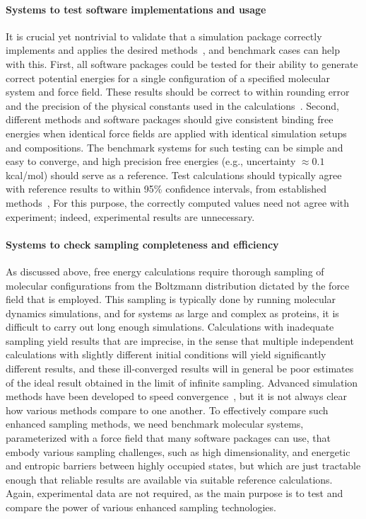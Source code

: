 \documentclass[aps,pre,twocolumn,nofootinbib,superscriptaddress,10pt, final,tightenlines]{revtex4-1}
\begin{document}
\paragraph{Systems to test software implementations and usage}
It is crucial yet nontrivial to validate that a simulation package correctly implements and applies the desired methods~\cite{shirts_lessons_2016}, and benchmark cases can help with this.  
First, all software packages could be tested for their ability to generate correct potential energies for a single configuration of a specified molecular system and force field. 
These results should be correct to within rounding error and the precision of the physical constants used in the calculations~\cite{shirts_lessons_2016}. 
Second, different methods and software packages should give consistent binding free energies when identical force fields are applied with identical simulation setups and compositions. 
The benchmark systems for such testing can be simple and easy to converge, and high precision free energies (e.g., uncertainty $\approx 0.1$ kcal/mol) should serve as a reference. 
Test calculations should typically agree with reference results to within 95\% confidence intervals, from established methods~\cite{shirts_statistically_2008,flyvbjerg_error_1989},
For this purpose, the correctly computed values need not agree with experiment; indeed, experimental results are unnecessary.

\paragraph{Systems to check sampling completeness and efficiency}
\label{sec:hard-sampling}
As discussed above, free energy calculations require thorough sampling of molecular configurations from the Boltzmann distribution dictated by the force field that is employed. 
This sampling is typically done by running molecular dynamics simulations, and for systems as large and complex as proteins, it is difficult to carry out long enough simulations. 
Calculations with inadequate sampling yield results that are imprecise, in the sense that multiple independent calculations with slightly different initial conditions will yield significantly different results, and these ill-converged results will in general be poor estimates of the ideal result obtained in the limit of infinite sampling. 
Advanced simulation methods have been developed to speed convergence~\cite{tai_conformational_2004, shirts_introduction_2013},  but it is not always clear how various methods compare to one another. 
To effectively compare such enhanced sampling methods, we need benchmark molecular systems, parameterized with a force field that many software packages can use, that embody various sampling challenges, such as high dimensionality, and energetic and entropic barriers between highly occupied states, but which are just tractable enough that reliable results are available via suitable reference calculations.
Again, experimental data are not required, as the main purpose is to test and compare the power of various enhanced sampling technologies. 
\end{document}
